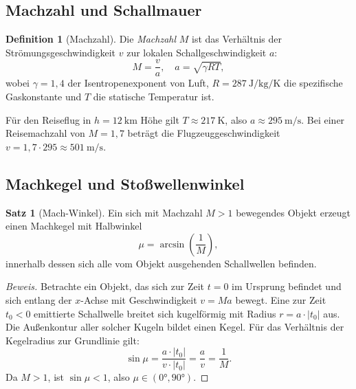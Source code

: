 ﻿\documentclass[12pt,a4paper]{article}
\theoremstyle{definition}
\newtheorem{definition}{Definition}[section]
\newtheorem{satz}{Satz}[section]
\theoremstyle{remark}
\newenvironment{beweis}{\begin{proof}[Beweis]}{\end{proof}}
\begin{document}
\subsection{Machzahl und Schallmauer}

\begin{definition}[Machzahl]
  Die \emph{Machzahl} $M$ ist das Verhältnis der Strömungsgeschwindigkeit $v$ zur lokalen
  Schallgeschwindigkeit $a$:
  \begin{equation}
    M = \frac{v}{a}, \quad a = \sqrt{\gamma R T},
    \label{eq:machzahl}
  \end{equation}
  wobei $\gamma = 1{,}4$ der Isentropenexponent von Luft, $R = \SI{287}{\joule\per\kilogram\per\kelvin}$
  die spezifische Gaskonstante und $T$ die statische Temperatur ist.
\end{definition}

Für den Reiseflug in $h = \SI{12}{\kilo\meter}$ Höhe gilt $T \approx \SI{217}{\kelvin}$,
also $a \approx \SI{295}{\meter\per\second}$. Bei einer Reisemachzahl von $M = 1{,}7$
beträgt die Flugzeuggeschwindigkeit $v = 1{,}7 \cdot 295 \approx \SI{501}{\meter\per\second}$.

\subsection{Machkegel und Stoßwellenwinkel}

\begin{satz}[Mach-Winkel]
  \label{satz:mach_winkel}
  Ein sich mit Machzahl $M > 1$ bewegendes Objekt erzeugt einen Machkegel mit Halbwinkel
  \begin{equation}
    \mu = \arcsin\!\left(\frac{1}{M}\right),
    \label{eq:mach_winkel}
  \end{equation}
  innerhalb dessen sich alle vom Objekt ausgehenden Schallwellen befinden.
\end{satz}

\begin{beweis}
  Betrachte ein Objekt, das sich zur Zeit $t = 0$ im Ursprung befindet und sich entlang
  der $x$-Achse mit Geschwindigkeit $v = Ma$ bewegt. Eine zur Zeit $t_0 < 0$ emittierte
  Schallwelle breitet sich kugelförmig mit Radius $r = a \cdot |t_0|$ aus. Die Außenkontur
  aller solcher Kugeln bildet einen Kegel. Für das Verhältnis der Kegelradius zur
  Grundlinie gilt:
  \begin{equation}
    \sin\mu = \frac{a \cdot |t_0|}{v \cdot |t_0|} = \frac{a}{v} = \frac{1}{M}.
  \end{equation}
  Da $M > 1$, ist $\sin\mu < 1$, also $\mu \in (0 °, 90 °)$. \qedhere
\end{beweis}
\end{document}
